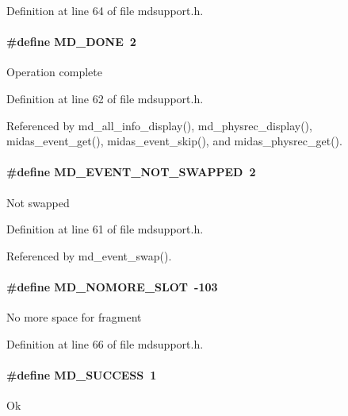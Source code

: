 Definition at line 64 of file mdsupport.h.
\paragraph[{MD\_\-DONE}]{\setlength{\rightskip}{0pt plus 5cm}\#define MD\_\-DONE~2}\hfill\label{group__mdsupporterrorh_ga34fdf952284be03aca04a46985b2e57f}
Operation complete 

Definition at line 62 of file mdsupport.h.

Referenced by md\_\-all\_\-info\_\-display(), md\_\-physrec\_\-display(), midas\_\-event\_\-get(), midas\_\-event\_\-skip(), and midas\_\-physrec\_\-get().
\paragraph[{MD\_\-EVENT\_\-NOT\_\-SWAPPED}]{\setlength{\rightskip}{0pt plus 5cm}\#define MD\_\-EVENT\_\-NOT\_\-SWAPPED~2}\hfill\label{group__mdsupporterrorh_ga34a6e506a7e596c2c044e51ed5d8359d}
Not swapped 

Definition at line 61 of file mdsupport.h.

Referenced by md\_\-event\_\-swap().
\paragraph[{MD\_\-NOMORE\_\-SLOT}]{\setlength{\rightskip}{0pt plus 5cm}\#define MD\_\-NOMORE\_\-SLOT~-\/103}\hfill\label{group__mdsupporterrorh_ga0491dd8f0e546f496c4059b8c04dd309}
No more space for fragment 

Definition at line 66 of file mdsupport.h.
\paragraph[{MD\_\-SUCCESS}]{\setlength{\rightskip}{0pt plus 5cm}\#define MD\_\-SUCCESS~1}\hfill\label{group__mdsupporterrorh_gab1b41e3db6549318f90440ed951d9cf8}
Ok 

